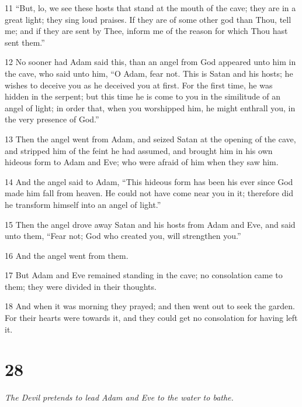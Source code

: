\par 11 “But, lo, we see these hosts that stand at the mouth of the cave; they are in a great light; they sing loud praises. If they are of some other god than Thou, tell me; and if they are sent by Thee, inform me of the reason for which Thou hast sent them.”

\par 12 No sooner had Adam said this, than an angel from God appeared unto him in the cave, who said unto him, “O Adam, fear not. This is Satan and his hosts; he wishes to deceive you as he deceived you at first. For the first time, he was hidden in the serpent; but this time he is come to you in the similitude of an angel of light; in order that, when you worshipped him, he might enthrall you, in the very presence of God.”

\par 13 Then the angel went from Adam, and seized Satan at the opening of the cave, and stripped him of the feint he had assumed, and brought him in his own hideous form to Adam and Eve; who were afraid of him when they saw him.

\par 14 And the angel said to Adam, “This hideous form has been his ever since God made him fall from heaven. He could not have come near you in it; therefore did he transform himself into an angel of light.”

\par 15 Then the angel drove away Satan and his hosts from Adam and Eve, and said unto them, “Fear not; God who created you, will strengthen you.”

\par 16 And the angel went from them.

\par 17 But Adam and Eve remained standing in the cave; no consolation came to them; they were divided in their thoughts.

\par 18 And when it was morning they prayed; and then went out to seek the garden. For their hearts were towards it, and they could get no consolation for having left it.

\chapter{28}

\par \textit{The Devil pretends to lead Adam and Eve to the water to bathe.}

